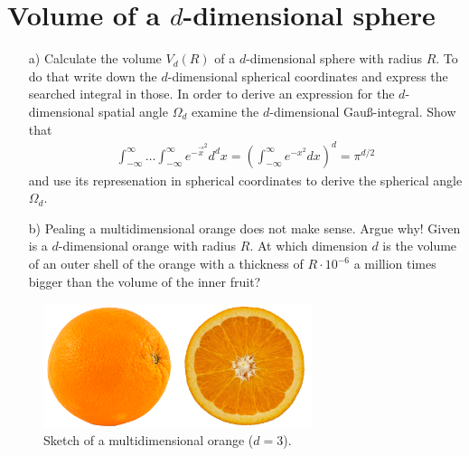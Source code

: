 \documentclass[12pt,a4paper]{article} %
\begin{document}
 
 
 \vspace{1cm}
 
 \section{Volume of a $d$-dimensional sphere}
\begin{itemize}
\item[a)] Calculate the volume $V_d(R)$ of a $d$-dimensional sphere with radius $R$. 
To do that write down the $d$-dimensional spherical coordinates and express the searched integral in those. 
In order to derive an expression for the $d$-dimensional spatial angle $\Omega_d$ examine the $d$-dimensional Gauß-integral. Show that
\begin{align}
\int_{-\infty}^\infty \dots \int_{-\infty}^\infty e^{-\vec{x}^2} d^dx = \left(\int_{-\infty}^\infty e^{-x^2}dx\right)^d = \pi^{d/2}
\end{align} and use its represenation in spherical coordinates to derive the spherical angle $\Omega_d$.

\item[b)] Pealing a multidimensional orange does not make sense. Argue why! Given is a $d$-dimensional orange with radius $R$. At which dimension $d$ is the volume of an outer shell of the orange with a thickness of $R\cdot 10^{-6}$ a million times bigger than the volume of the inner fruit?
\end{itemize} 

\begin{figure}[h!]
\begin{center}
\includegraphics[width= 0.7\textwidth]{oranges.png} 
\caption[Sketch of a multidimensional orange]{Sketch of a multidimensional orange ($d=3$)\footnotemark.}  
\end{center}
\end{figure}
\end{document}
